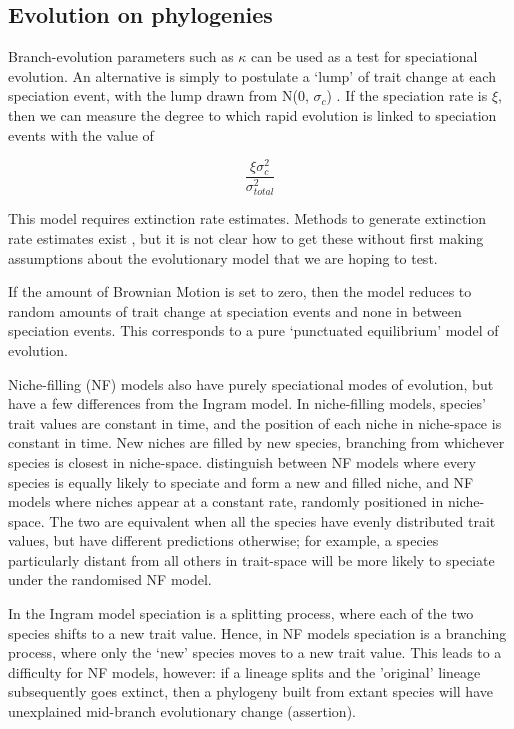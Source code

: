 \documentclass[12pt]{article}
\begin{document}
\subsection{Evolution on phylogenies}

Branch-evolution parameters such as $\kappa$ can be used as a test for speciational evolution. An alternative is simply to postulate a `lump' of trait change at each speciation event, with the lump drawn from N(0, $\sigma_c$) \citep{bokma_detection_2008, ingram_speciation_2010}. If the speciation rate is $\xi$, then we can measure the degree to which rapid evolution is linked to speciation events with the value of

\begin{equation}
	\frac{\xi \sigma^2_c}{\sigma^2_{total}}   %
\end{equation}

This model requires extinction rate estimates. Methods to generate extinction rate estimates exist \citep{rabosky_heritability_2009,pybus_testing_2000}, but it is not clear how to get these without first making assumptions about the evolutionary model that we are hoping to test.

If the amount of Brownian Motion is set to zero, then the \cite{ingram_speciation_2010} model reduces to random amounts of trait change at speciation events and none in between speciation events. This corresponds to a pure `punctuated equilibrium' model of evolution.

Niche-filling (NF) models \citep{freckleton_detecting_2006,price_correlated_1997,harvey_comparative_2000} also have purely speciational modes of evolution, but have a few differences from the Ingram model. In niche-filling models, species' trait values are constant in time, and the position of each niche in niche-space is constant in time. New niches are filled by new species, branching from whichever species is closest in niche-space. 
\citet{freckleton_detecting_2006} distinguish between NF models where every species is equally likely to speciate and form a new and filled niche, and NF models where niches appear at a constant rate, randomly positioned in niche-space. The two are equivalent when all the species have evenly distributed trait values, but have different predictions otherwise; for example, a species particularly distant from all others in trait-space will be more likely to speciate under the randomised NF model.

In the Ingram model speciation is a splitting process, where each of the two species shifts to a new trait value. Hence, in NF models speciation is a branching process, where only the `new' species moves to a new trait value. This leads to a difficulty for NF models, however: if a lineage splits and the 'original' lineage subsequently goes extinct, then a phylogeny built from extant species will have unexplained mid-branch evolutionary change (assertion).
\end{document}
